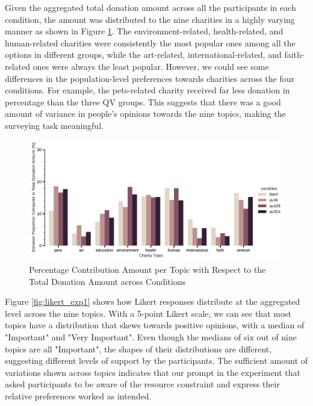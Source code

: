 Given the aggregated total donation amount across all the participants in each condition, the amount was distributed to the nine charities in a highly varying manner as shown in Figure \ref{fig:topic_don_exp1}. The environment-related, health-related, and human-related charities were consistently the most popular ones among all the options in different groups, while the art-related, international-related, and faith-related ones were always the least popular. However, we could see some differences in the population-level preferences towards charities across the four conditions. For example, the pets-related charity received far less donation in percentage than the three QV groups. This suggests that there was a good amount of variance in people's opinions towards the nine topics, making the surveying task meaningful.

\begin{figure}[htpb]
    \centering
    \includegraphics[width=\textwidth, keepaspectratio=true]{content/image/normalized_contributions_per_topic_across_conditions.pdf}
    \caption{
      Percentage Contribution Amount per Topic with Respect to the Total Donation Amount across Conditions
    }
    \label{fig:topic_don_exp1}
\end{figure}


Figure \ref{fig:likert_exp1} shows how Likert responses distribute at the aggregated level across the nine topics. With a 5-point Likert scale, we can see that most topics have a distribution that skews towards positive opinions, with a median of "Important" and "Very Important". Even though the medians of six out of nine topics are all "Important", the shapes of their distributions are different, suggesting different levels of support by the participants. The sufficient amount of variations shown across topics indicates that our prompt in the experiment that asked participants to be aware of the resource constraint and express their relative preferences worked as intended. 

